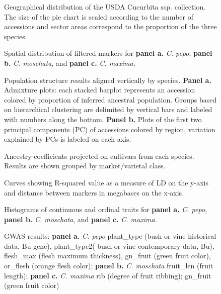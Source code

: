 \documentclass[utf8]{FrontiersinHarvard} %
\begin{document}
\begin{figure}[h]
\caption{Geographical distribution of the USDA Cucurbita ssp. collection. The size of the pie chart is scaled according to the number of accessions and sector areas correspond to the proportion of the three species. \label{fig:2}}
\end{figure}

\begin{figure}[h]
\caption{Spatial distribution of filtered markers for \textbf{panel a.} \textit{C. pepo}, \textbf{panel b.} \textit{C. moschata}, and \textbf{panel c.} \textit{C. maxima.} \label{fig:3}}
\end{figure}

\begin{figure}[h]
	\caption{Population structure results aligned vertically by species. \textbf{Panel a.} Admixture plots: each stacked barplot represents an accession colored by proportion of inferred ancestral population. Groups based on hierarchical clustering are delimited by vertical bars and labeled with numbers along the bottom. \textbf{Panel b.} Plots of the first two principal components (PC) of accessions colored by region, variation explained by PCs is labeled on each axis. \label{fig:4}}
\end{figure}


\begin{figure}[h]
	\caption{Ancestry coefficients projected on cultivars from each species. Results are shown grouped by market/varietal class. \label{fig:5}}
\end{figure}

\begin{figure}[h]
	\caption{Curves showing R-squared value as a measure of LD on the y-axis and distance between markers in megabases on the x-axis. \label{fig:6}}
\end{figure}


\begin{figure}[h]
	\caption{Histograms of continuous and ordinal traits for \textbf{panel a.} \textit{C. pepo}, \textbf{panel b.} \textit{C. moschata}, and \textbf{panel c.} \textit{C. maxima.}\label{fig:7}}
\end{figure}

\begin{figure}[h]
	\caption{GWAS results: \textbf{panel a.} \textit{C. pepo} plant\_type (bush or vine historical data, Bu gene), plant\_type2( bush or vine contemporary data, Bu), flesh\_max (flesh maximum thickness), gn\_fruit (green fruit color), or\_flesh (orange flesh color); \textbf{panel b.} \textit{C. moschata} fruit\_len (fruit length); \textbf{panel c.} \textit{C. maxima} rib (degree of fruit ribbing); gn\_fruit (green fruit color) \label{fig:8}}
\end{figure}
\end{document}
